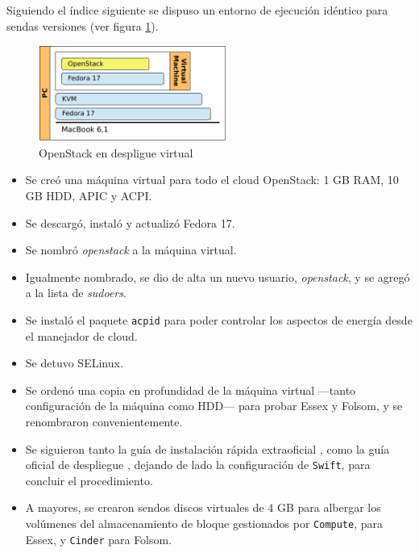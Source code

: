 Siguiendo el \'indice siguiente se dispuso un entorno de ejecuci\'on id\'entico para sendas versiones (ver figura \ref{fig:openstack}).

\begin{figure}[tbp]
\begin{center}
\includegraphics[width=0.55\textwidth]{imagenes/010.pdf}
 \caption{OpenStack en despligue virtual}
\label{fig:openstack}
\end{center}
\end{figure}

\begin{itemize}
 \item Se cre\'o una m\'aquina virtual para todo el cloud OpenStack: 1 GB RAM, 10 GB HDD, APIC y ACPI.
 \item Se descarg\'o, instal\'o y actualiz\'o Fedora 17.
 \item Se nombr\'o \emph{openstack} a la m\'aquina virtual.
 \item Igualmente nombrado, se dio de alta un nuevo usuario, \emph{openstack}, y se agreg\'o a la lista de \emph{sudoers}.
 \item Se instal\'o el paquete \texttt{acpid} para poder controlar los aspectos de energ\'ia desde el manejador de cloud.
 \item Se detuvo SELinux.
 \item Se orden\'o una copia en profundidad de la m\'aquina virtual ---tanto configuraci\'on de la m\'aquina como HDD--- para probar Essex y Folsom, y se renombraron convenientemente.
 \item Se siguieron tanto la gu\'ia de instalaci\'on r\'apida extraoficial \cite{quickstartfedoraos}, como la gu\'ia oficial de despliegue \cite{installdeployosfolsom}, dejando de lado la con\-fi\-gu\-ra\-ci\'on de \texttt{Swift}, para concluir el procedimiento.
 \item A mayores, se crearon sendos discos virtuales de 4 GB para albergar los vol\'umenes del almacenamiento de bloque gestionados por \texttt{Compute}, para Essex, y \texttt{Cinder} para Folsom.
\end{itemize}
 

